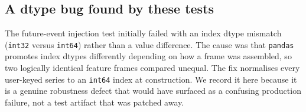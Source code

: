 \subsection{A dtype bug found by these tests}

The future-event injection test initially failed with an index dtype mismatch
(\texttt{int32} versus \texttt{int64}) rather than a value difference. The
cause was that \texttt{pandas} promotes index dtypes differently depending on
how a frame was assembled, so two logically identical feature frames compared
unequal. The fix normalises every user-keyed series to an \texttt{int64}
index at construction. We record it here because it is a genuine robustness
defect that would have surfaced as a confusing production failure, not a
test artifact that was patched away.
